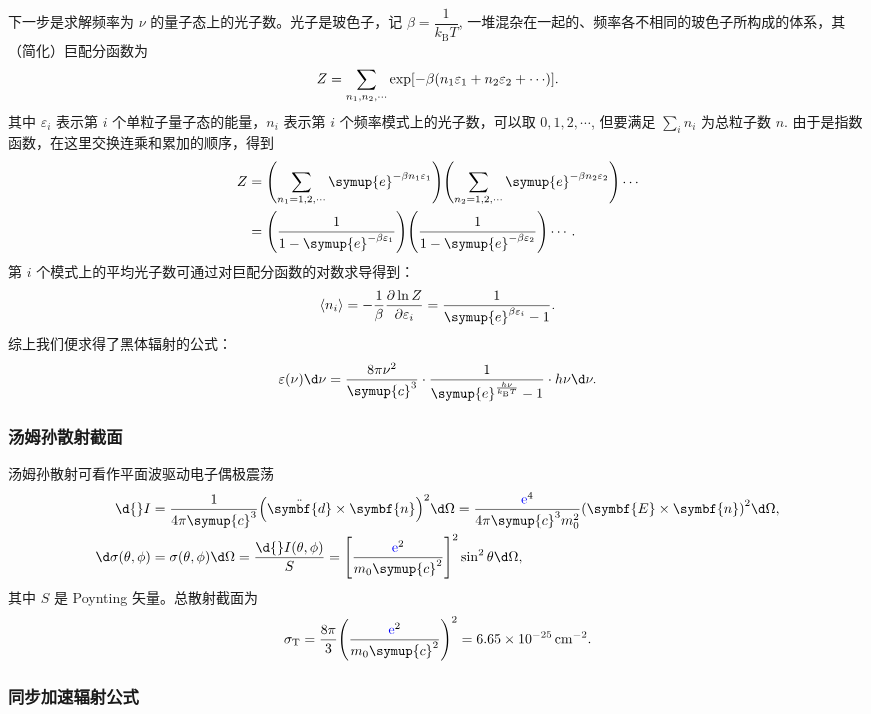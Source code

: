 \documentclass[../天体物理基础.tex]{subfiles}
\begin{document}
下一步是求解频率为 $\nu$ 的量子态上的光子数。光子是玻色子，记 $\beta=\dfrac{1}{k_{\mathrm{B}}T}$, 一堆混杂在一起的、频率各不相同的玻色子所构成的体系，其（简化）巨配分函数为
\begin{equation}
Z=\sum_{n_{1}, n_{2},\cdots}\exp\mleft[-\beta\mleft(n_{1}\varepsilon_{1}+n_{2}\varepsilon_{2}+\cdots\mright)\mright].
\end{equation}
其中 $\varepsilon_{i}$ 表示第 $i$ 个单粒子量子态的能量，$n_{i}$ 表示第 $i$ 个频率模式上的光子数，可以取 $0, 1, 2,\cdots$, 但要满足 $\sum_{i}n_{i}$ 为总粒子数 $n$. 由于是指数函数，在这里交换连乘和累加的顺序，得到
\begin{align}
Z&=\mleft(\sum_{n_{1}=1, 2,\cdots}\symup{e}^{-\beta n_{1}\varepsilon_{1}}\mright)\mleft(\sum_{n_{2}=1, 2,\cdots}\symup{e}^{-\beta n_{2}\varepsilon_{2}}\mright)\cdots\\
&=\mleft(\frac{1}{1-\symup{e}^{-\beta\varepsilon_{1}}}\mright)\mleft(\frac{1}{1-\symup{e}^{-\beta\varepsilon_{2}}}\mright)\cdots.
\end{align}
第 $i$ 个模式上的平均光子数可通过对巨配分函数的对数求导得到：
\begin{equation}
\langle{}n_{i}\rangle=-\frac{1}{\beta}\frac{\partial\ln Z}{\partial\varepsilon_{i}}=\frac{1}{\symup{e}^{\beta\varepsilon_{i}}-1}.
\end{equation}
综上我们便求得了黑体辐射的公式：
\begin{equation}
\varepsilon\mleft(\nu\mright)\d\nu=\frac{8\pi\nu^{2}}{\symup{c}^{3}}\cdot\frac{1}{\symup{e}^{\frac{h\nu}{k_{\mathrm{B}}T}}-1}\cdot{}h\nu\d\nu.
\end{equation}

\subsubsection{汤姆孙散射截面}
汤姆孙散射可看作平面波驱动电子偶极震荡
\begin{align}
\d{}I&=\frac{1}{4\pi\symup{c}^{3}}\mleft(\ddot{\symbf{d}}\times\symbf{n}\mright)^{2}\d\Omega=\frac{{\color{blue}{\ce{e}}}^{4}}{4\pi\symup{c}^{3}m_{0}^{2}}\mleft(\symbf{E}\times\symbf{n}\mright)^{2}\d\Omega,\\
\d\sigma\mleft(\theta,\phi\mright)&=\sigma\mleft(\theta,\phi\mright)\d\Omega=\frac{\d{}I\mleft(\theta,\phi\mright)}{S}=\mleft[\frac{{\color{blue}{\ce{e}}}^{2}}{m_{0}\symup{c}^{2}}\mright]^{2}\sin^{2}{\theta}\d\Omega,
\end{align}
其中 $S$ 是 Poynting 矢量。总散射截面为
\begin{equation}
\sigma_{\mathrm{T}}=\frac{8\pi}{3}\mleft(\frac{{\color{blue}{\ce{e}}}^{2}}{m_{0}\symup{c}^{2}}\mright)^{2}=\qty{6.65e-25}{cm^{-2}}.
\end{equation}

\subsubsection{同步加速辐射公式}

\end{document}
